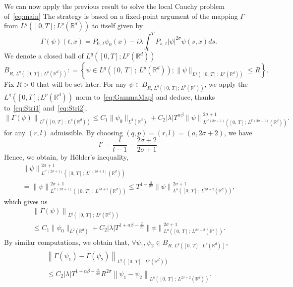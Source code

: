 \documentclass[10pt]{amsart}
\theoremstyle{definition}\newtheorem{defi}[theo]{Definition}\newtheorem{rema}[theo]{Remark}\newtheorem{exam}[theo]{Example}\newtheorem{exem}[theo]{Example}\newtheorem{nota}[theo]{Notation}
\newcommand{\bbR}{\mathbb{R}}
\let\oldforall\forall
\renewcommand*{\forall}{\mathrel{\oldforall}}
\begin{document}
We can now apply the previous result to solve the local Cauchy problem of~\eqref{eq:main} The strategy is based on a fixed-point argument of the mapping $\Gamma$ from $L^{q}([0,T];L^p(\bbR^d))$ to itself given by
\begin{equation}\label{eq:GammaMap}
\Gamma(\psi)(t,x) = P_{0,\,t}\psi_0(x) - i\lambda \int_0^T P_{s,\,t}|\psi|^{2\sigma}\psi(s,x) ds.
\end{equation}
We denote a closed ball of $L^{q}([0,T];L^p(\bbR^d))$
\[
B_{R,\,L^{q}\left([0,\,T]\,;\,L^p\left(\bbR^d\right)\right)} : = \left\{ \psi \in L^{q}\left([0,\,T]\,;\,L^p\left(\bbR^d\right)\right); \|\psi\|_{L^{q}\left([0,\,T]\,;\,L^p\left(\bbR^d\right)\right)} \leq R\right\}.
\]
Fix $R>0$ that will be set later. For any $\psi \in B_{R,\,L^{q}([0,\,T];\,L^p(\bbR^d))}$, we apply the $L^q([0,T];L^p(\bbR^d))$ norm to~\eqref{eq:GammaMap} and deduce, thanks to~\eqref{eq:Stri1} and~\eqref{eq:Stri2},
\[
\left\|\Gamma(\psi)\right\|_{L^{q}\left([0,\,T]\,;\,L^p\left(\bbR^d\right)\right)}\leq C_1\|\psi_0\|_{L^2\left(\bbR^d\right)} + C_2|\lambda| T^{\alpha\beta}\left\|\psi\right\|_{L^{r'\left(2\sigma+1\right)}\left([0,\,T]\,;\,L^{l'\left(2\sigma+1\right)}\left(\bbR^d\right)\right)}^{2\sigma+1}.
\]
for any $(r,l)$ admissible. By choosing $(q,p) = (r,l) = \left(a,2\sigma+2\right)$, we have
\[
l' = \frac{l}{l-1} = \frac{2\sigma+2}{2\sigma +1}.
\]
Hence, we obtain, by H\"older's inequality,
\begin{multline*}
\left\|\psi\right\|_{L^{r'\left(2\sigma+1\right)}\left([0,\,T]\,;\,L^{l'\left(2\sigma+1\right)} \left(\bbR^d\right)\right)}^{2\sigma+1}\\
= \left\|\psi\right\|_{L^{r'\left(2\sigma+1\right)}\left([0,\,T]\,;\,L^{2\sigma+2}\left(\bbR^d\right)\right)}^{2\sigma+1} \leq T^{1-\frac{2}{d\sigma}} \left\|\psi\right\|_{L^{a}\left([0,\,T]\,;\,L^{2\sigma+2} \left(\bbR^d\right)\right)}^{2\sigma+1},
\end{multline*}
which gives us
\begin{multline}\label{eq:Gammaest1}
\left\|\Gamma(\psi)\right\|_{L^{q}\left([0,\,T]\,;\,L^p\left(\bbR^d\right)\right)}\\\leq C_1\|\psi_0\|_{L^2\left(\bbR^d\right)} + C_2|\lambda| T^{1+\alpha\beta-\frac{2}{d\sigma}} \left\|\psi\right\|_{L^{a}\left([0,\,T]\,;\,L^{2\sigma+2}\left(\bbR^d\right)\right)}^{2\sigma+1}.
\end{multline}
By similar computations, we obtain that, $\forall \psi_1,\psi_2\in B_{R,\,L^{q}([0,\,T]\,;\,L^p(\bbR^d))}$,
\begin{multline}\label{eq:Gammaest2}
\left\|\Gamma(\psi_1) - \Gamma(\psi_2)\right\|_{L^{q}\left([0,\,T]\,;\,L^p\left(\bbR^d\right)\right)}\\
\leq C_2|\lambda| T^{1+\alpha\beta-\frac{2}{d\sigma}} R^{2\sigma}\left\|\psi_1 - \psi_2\right\|_{L^{a}\left([0,\,T]\,;\,L^{2\sigma+2}\left(\bbR^d\right)\right)}.
\end{multline}
\end{document}

